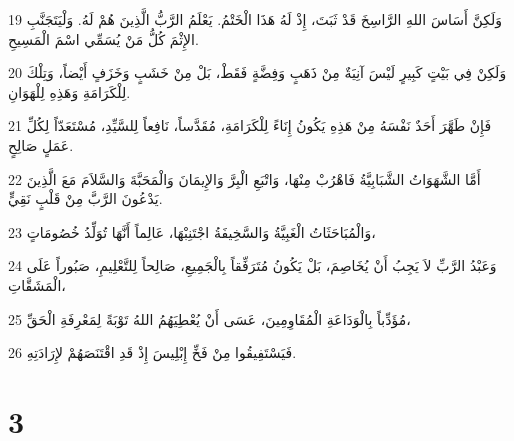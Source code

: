 \par 19 وَلَكِنَّ أَسَاسَ اللهِ الرَّاسِخَ قَدْ ثَبَتَ، إِذْ لَهُ هَذَا الْخَتْمُ. يَعْلَمُ الرَّبُّ الَّذِينَ هُمْ لَهُ. وَلْيَتَجَنَّبِ الإِثْمَ كُلُّ مَنْ يُسَمِّي اسْمَ الْمَسِيحِ.
\par 20 وَلَكِنْ فِي بَيْتٍ كَبِيرٍ لَيْسَ آنِيَةٌ مِنْ ذَهَبٍ وَفِضَّةٍ فَقَطْ، بَلْ مِنْ خَشَبٍ وَخَزَفٍ أَيْضاً، وَتِلْكَ لِلْكَرَامَةِ وَهَذِهِ لِلْهَوَانِ.
\par 21 فَإِنْ طَهَّرَ أَحَدٌ نَفْسَهُ مِنْ هَذِهِ يَكُونُ إِنَاءً لِلْكَرَامَةِ، مُقَدَّساً، نَافِعاً لِلسَّيِّدِ، مُسْتَعَدّاً لِكُلِّ عَمَلٍ صَالِحٍ.
\par 22 أَمَّا الشَّهَوَاتُ الشَّبَابِيَّةُ فَاهْرُبْ مِنْهَا، وَاتْبَعِ الْبِرَّ وَالإِيمَانَ وَالْمَحَبَّةَ وَالسَّلاَمَ مَعَ الَّذِينَ يَدْعُونَ الرَّبَّ مِنْ قَلْبٍ نَقِيٍّ.
\par 23 وَالْمُبَاحَثَاتُ الْغَبِيَّةُ وَالسَّخِيفَةُ اجْتَنِبْهَا، عَالِماً أَنَّهَا تُوَلِّدُ خُصُومَاتٍ،
\par 24 وَعَبْدُ الرَّبِّ لاَ يَجِبُ أَنْ يُخَاصِمَ، بَلْ يَكُونُ مُتَرَفِّقاً بِالْجَمِيعِ، صَالِحاً لِلتَّعْلِيمِ، صَبُوراً عَلَى الْمَشَقَّاتِ،
\par 25 مُؤَدِّباً بِالْوَدَاعَةِ الْمُقَاوِمِينَ، عَسَى أَنْ يُعْطِيَهُمُ اللهُ تَوْبَةً لِمَعْرِفَةِ الْحَقِّ،
\par 26 فَيَسْتَفِيقُوا مِنْ فَخِّ إِبْلِيسَ إِذْ قَدِ اقْتَنَصَهُمْ لإِرَادَتِهِ.

\chapter{3}

